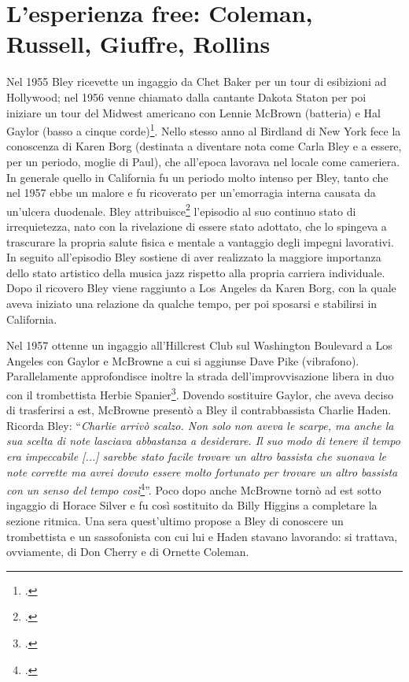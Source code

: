 \section{L'esperienza free: Coleman, Russell, Giuffre, Rollins}
Nel 1955 Bley ricevette un ingaggio da Chet Baker per un tour di esibizioni ad Hollywood; nel 1956 venne chiamato dalla cantante Dakota Staton per poi iniziare un tour del Midwest americano con Lennie McBrown (batteria) e Hal Gaylor (basso a cinque corde)\footcite[49]{stopping}. Nello stesso anno al Birdland di New York fece la conoscenza di Karen Borg (destinata a diventare nota come Carla Bley e a essere, per un periodo, moglie di Paul), che all'epoca lavorava nel locale come cameriera. \\
In generale quello in California fu un periodo molto intenso per Bley, tanto che nel 1957 ebbe un malore e fu ricoverato per un'emorragia interna causata da un'ulcera duodenale. Bley attribuisce\footcite[54]{stopping} l'episodio al suo continuo stato di irrequietezza, nato con la rivelazione di essere stato adottato, che lo spingeva a trascurare la propria salute fisica e mentale a vantaggio degli impegni lavorativi. In seguito all'episodio Bley sostiene di aver realizzato la maggiore importanza dello stato artistico della musica jazz rispetto alla propria carriera individuale. Dopo il ricovero Bley viene raggiunto a Los Angeles da Karen Borg, con la quale aveva iniziato una relazione da qualche tempo, per poi sposarsi e stabilirsi in California.\par
Nel 1957 ottenne un ingaggio all'Hillcrest Club sul Washington Boulevard a Los Angeles con Gaylor e McBrowne a cui si aggiunse Dave Pike (vibrafono). Parallelamente approfondisce inoltre la strada dell'improvvisazione libera in duo con il trombettista Herbie Spanier\footcite[58]{stopping}. Dovendo sostituire Gaylor, che aveva deciso di trasferirsi a est, McBrowne presentò a Bley il contrabbassista Charlie Haden. Ricorda Bley: ``\textit{Charlie arrivò scalzo. Non solo non aveva le scarpe, ma anche la sua scelta di note lasciava abbastanza a desiderare. Il suo modo di tenere il tempo era impeccabile [...] sarebbe stato facile trovare un altro bassista che suonava le note corrette ma avrei dovuto essere molto fortunato per trovare un altro bassista con un senso del tempo così}\footcite[62]{stopping}''. Poco dopo anche McBrowne tornò ad est sotto ingaggio di Horace Silver e fu così sostituito da Billy Higgins a completare la sezione ritmica. Una sera quest'ultimo propose a Bley di conoscere un trombettista e un sassofonista con cui lui e Haden stavano lavorando: si trattava, ovviamente, di Don Cherry e di Ornette Coleman.
